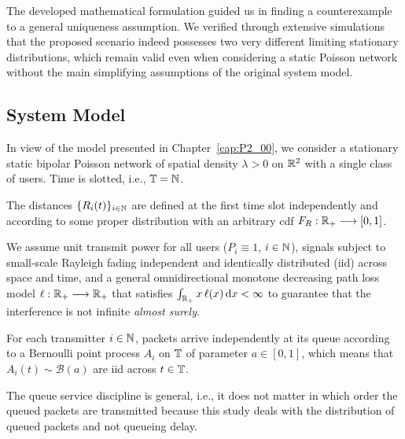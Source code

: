 The developed mathematical formulation guided us in finding a counterexample to a general uniqueness assumption.
%
We verified through extensive simulations that the proposed scenario indeed possesses two very different limiting stationary distributions, which remain valid even when considering a static Poisson network without the main simplifying assumptions of the original system model.

\subsection{System Model}
\label{sec:sysmod}

In view of the model presented in Chapter~\ref{cap:P2_00}, we consider a stationary static bipolar Poisson network of spatial density ${\lambda>0}$ on ${\mathbb R}^2$ with a single class of users. %
%
Time is slotted, i.e., ${\mathbb T}={\mathbb N}$.

The distances $\{R_i(t)\}_{i\in{\mathbb N}}$ are defined at the first time slot independently and according to some proper distribution with an arbitrary cdf ${F_R:{\mathbb R}_+\longrightarrow[0,1]}$.


%

We assume unit transmit power for all users ($P_i\equiv 1$, $i\in{\mathbb N}$), signals subject to small-scale Rayleigh fading independent and identically distributed (iid) across space and time, and a general omnidirectional monotone decreasing path loss model ${\ell:{\mathbb R}_+\longrightarrow{\mathbb R}_+}$ that satisfies $\int_{{\mathbb R}_+} x\,\ell(x)\,\mathrm{d} x < \infty$ to guarantee that the interference is not infinite \textit{almost surely}.

For each transmitter $i\in{\mathbb N}$, packets arrive independently at its queue according to a Bernoulli point process $A_i$ on ${\mathbb T}$ of parameter $a\in[0,1]$, which means that $A_i(t)\sim\mathscr{B}(a)$ are iid across $t\in{\mathbb T}$.

The queue service discipline is general, i.e., it does not matter in which order the queued packets are transmitted because this study deals with the distribution of queued packets and not queueing delay.

